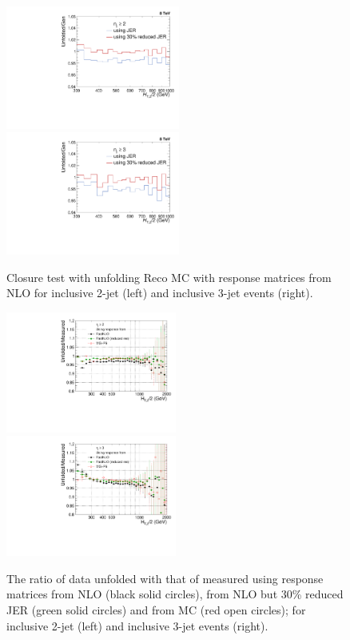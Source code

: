 \begin{figure}[!htp]
 \begin{center}
 \includegraphics[width=0.51\textwidth]{Plots_HT_2_150/Comparison_closure_2_range.pdf}%
 ~~\includegraphics[width=0.51\textwidth]{Plots_HT_2_150/Comparison_closure_3.pdf}
 \caption{Closure test with unfolding \MadGraphF \plus \PYTHIAS Reco MC with response matrices from NLO for inclusive 2-jet (left) and inclusive 3-jet events (right).}
 \label{fig:unfolded_reco_NLO}
 \end{center}
\end{figure}

\begin{figure}[!htp]
  \begin{center}
    \includegraphics[width=0.5\textwidth]{Plots_HT_2_150/Ratio_Unfolding_data_NLO_2.pdf}%
    \includegraphics[width=0.5\textwidth]{Plots_HT_2_150/Ratio_Unfolding_data_NLO_3.pdf}
    \caption{The ratio of data unfolded with that of measured using response matrices from NLO (black solid circles), from NLO but 30\% reduced JER (green solid circles) and from MC (red open circles); for inclusive 2-jet (left) and inclusive 3-jet events (right).}
    \label{fig:unfolded_data}
  \end{center}
\end{figure}

